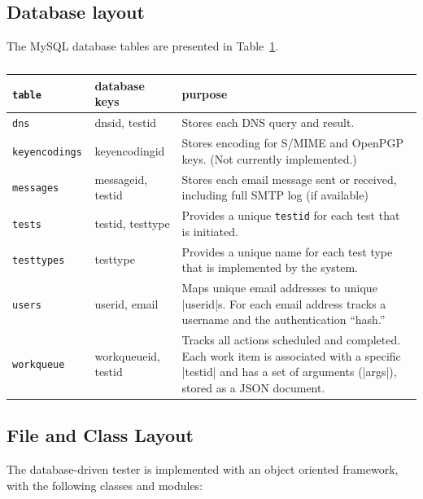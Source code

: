 \documentclass[preprint,3p]{elsarticle}
\begin{document}
\subsection{Database layout}

The MySQL database tables are presented in Table~\ref{db}. 

\begin{table}
\begin{tabular}{>{\tt}llp{4in}}
\textrm{table} & database keys & purpose \\
\hline
dns & dnsid, testid & Stores each DNS query and result. \\
keyencodings & keyencodingid & Stores encoding for S/MIME and OpenPGP keys. (Not currently implemented.) \\
messages & messageid, testid & Stores each email message sent or received, including full SMTP log (if available) \\
tests & testid, testtype & Provides a unique \texttt{testid} for each test that is initiated.\\
testtypes & testtype & Provides a unique name for each test type that is implemented by the system.\\
users & userid, email & Maps unique email addresses to unique |userid|s. For each email address tracks a username and the authentication ``hash.''\\
workqueue & workqueueid, testid & Tracks all actions scheduled and completed. Each work item is associated with a specific |testid| and has a set of arguments (|args|), stored as a JSON document.\\
\end{tabular}
\caption{}\label{db}
\end{table}

\subsection{File and Class Layout}
The database-driven tester is implemented with an object oriented
framework, with the following classes and modules:
\end{document}
